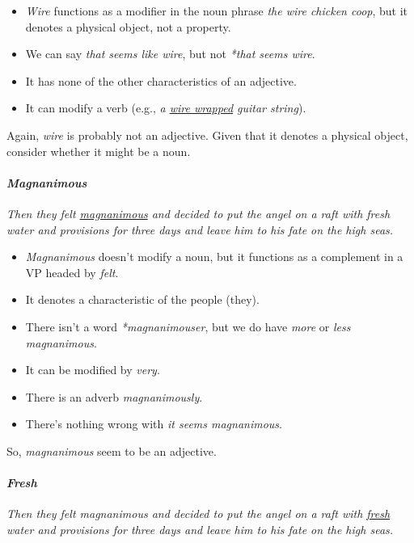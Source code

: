 \begin{itemize}[noitemsep]
    \item \textit{Wire} functions as a modifier in the noun phrase \textit{the wire chicken coop}, but it denotes a physical object, not a property.
    \item We can say \textit{that seems like wire}, but not \textit{*that seems wire}.
    \item It has none of the other characteristics of an adjective.
    \item It can modify a verb (e.g., \textit{a \uline{wire wrapped} guitar string}).
\end{itemize}
Again, \textit{wire} is probably not an adjective. Given that it denotes a physical object, consider whether it might be a noun.

\paragraph*{\textit{Magnanimous}}
\textit{Then they felt \uline{magnanimous} and decided to put the angel on a raft with fresh water and provisions for three days and leave him to his fate on the high seas.}

\begin{itemize}[noitemsep]
    \item \textit{Magnanimous} doesn't modify a noun, but it functions as a complement in a VP headed by \textit{felt}.
    \item It denotes a characteristic of the people (they).
    \item There isn't a word \textit{*magnanimouser}, but we do have \textit{more} or \textit{less magnanimous}.
    \item It can be modified by \textit{very}.
    \item There is an adverb \textit{magnanimously}.
    \item There's nothing wrong with \textit{it seems magnanimous}.
\end{itemize}
So, \textit{magnanimous} seem to be an adjective.

\paragraph*{\textit{Fresh}}
\textit{Then they felt magnanimous and decided to put the angel on a raft with \uline{fresh} water and provisions for three days and leave him to his fate on the high seas.}

